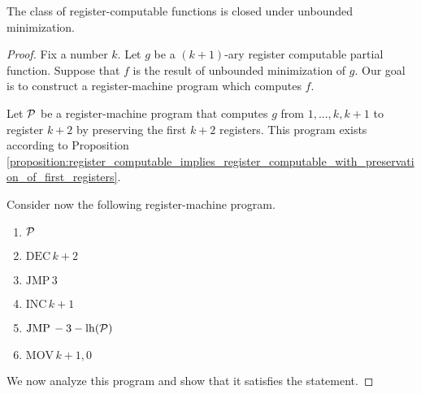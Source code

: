 \documentclass[10pt]{amsart}
\begin{document}
\begin{proposition}\label{proposition:register-computable_functions_closed_under_unbounded_minimization}
	The class of register-computable functions is closed under unbounded minimization.
\end{proposition}
\begin{proof}
	Fix a number $k$. Let $g$ be a $(k + 1)$-ary register computable partial function. Suppose that $f$ is the result of unbounded minimization of $g$. Our goal is to construct a register-machine program which computes $f$.

	Let ${\mathcal P}$ be a register-machine program that computes $g$ from $1,...,k,k+1$ to register $k + 2$ by preserving the first $k + 2$ registers. This program exists according to Proposition \ref{proposition:register_computable_implies_register_computable_with_preservation_of_first_registers}.

	Consider now the following register-machine program.
	\begin{enumerate}[label=\textbf{(\arabic*)}, leftmargin=3.0em]
		\item ${\mathcal P}$
		\item $\mathrm{DEC}\,k + 2$
		\item $\mathrm{JMP}\,3$
		\item $\mathrm{INC}\,k + 1$
		\item $\mathrm{JMP}\,- 3 - \mathrm{lh}({\mathcal P})$
		\item $\mathrm{MOV}\,k+1,0$
	\end{enumerate}
	We now analyze this program and show that it satisfies the statement.


\end{proof}
\end{document}
